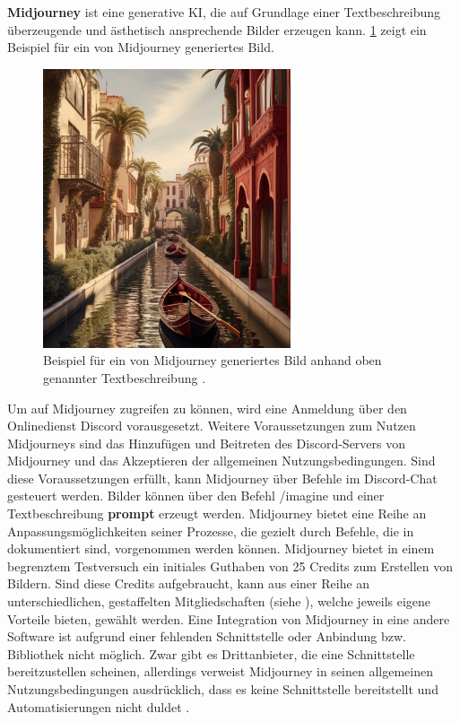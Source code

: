 
\textbf{Midjourney} ist eine generative KI, die auf Grundlage einer Textbeschreibung überzeugende und ästhetisch ansprechende Bilder erzeugen kann.
\cref{sec2:sota:subsubsec:fz1:discussion:fig:venice-midjourney} zeigt ein Beispiel für ein von Midjourney generiertes Bild.
\begin{figure}[htb]
    \centering
    \includegraphics[width=0.65\textwidth, keepaspectratio]{chapter/chapter_2/venice-midjourney.png}
    \caption{Beispiel für ein von Midjourney generiertes Bild anhand oben genannter Textbeschreibung \cite{reddit-venice-midjourney}.}
    \label{sec2:sota:subsubsec:fz1:discussion:fig:venice-midjourney}
\end{figure}
Um auf Midjourney zugreifen zu können, wird eine Anmeldung über den Onlinedienst Discord vorausgesetzt.
Weitere Voraussetzungen zum Nutzen Midjourneys sind das Hinzufügen und Beitreten des Discord-Servers von Midjourney und das Akzeptieren der allgemeinen Nutzungsbedingungen.
Sind diese Voraussetzungen erfüllt, kann Midjourney über Befehle im Discord-Chat gesteuert werden.
Bilder können über den Befehl /imagine und einer Textbeschreibung \textbf{prompt} erzeugt werden.
Midjourney bietet eine Reihe an Anpassungsmöglichkeiten seiner Prozesse, die gezielt durch Befehle, die in \cite{midjourney-docs} dokumentiert sind, vorgenommen werden können.
Midjourney bietet in einem begrenztem Testversuch ein initiales Guthaben von 25 Credits zum Erstellen von Bildern.
Sind diese Credits aufgebraucht, kann aus einer Reihe an unterschiedlichen, gestaffelten Mitgliedschaften (siehe \cite{midjourney-plans}), welche jeweils eigene Vorteile bieten, gewählt werden.
Eine Integration von Midjourney in eine andere Software ist aufgrund einer fehlenden Schnittstelle oder Anbindung bzw. Bibliothek nicht möglich.
Zwar gibt es Drittanbieter, die eine Schnittstelle bereitzustellen scheinen, allerdings verweist Midjourney in seinen allgemeinen Nutzungsbedingungen ausdrücklich, dass es keine Schnittstelle bereitstellt und Automatisierungen nicht duldet \cite{midjourney-tos}.

